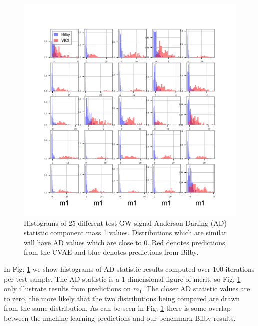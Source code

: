 \documentclass[%
showpacs,
 amsmath,amssymb,
 aps,
 twocolumn,
 prl,
 reprint,
floatfix,
]{revtex4-1}
\begin{document}
%
%
\begin{figure}
    \includegraphics[width=\columnwidth]{images/hist-ad_0.png}
    \caption{\label{fig:ad_results} Histograms of 
    25 different test GW signal Anderson-Darling (AD) statistic 
    component mass 1 values. Distributions which are similar 
    will have AD values which are close to 0.
    Red denotes predictions from the CVAE and blue 
    denotes predictions from Bilby.}
\end{figure}

In Fig. \ref{fig:ad_results} we show histograms of AD 
statistic results computed over $100$ iterations per test sample. 
The AD statistic is a 1-dimensional figure of merit, 
so Fig. \ref{fig:ad_results} only illustrate results 
from predictions on $m_1$. The closer AD statistic 
values are to zero, the more likely that the two 
distributions being compared are drawn from 
the same distribution. As can be seen in Fig. \ref{fig:ad_results} 
there is some overlap between the machine learning 
predictions and our benchmark Bilby results.
\end{document}
